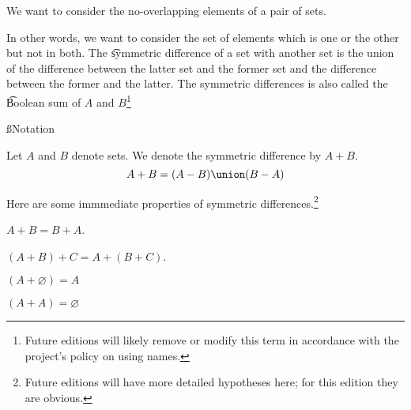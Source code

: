 

We want to consider the no-overlapping elements of a pair of sets.


In other words, we want to consider the set of elements which is one or the other but not in both.
The \t{symmetric difference} of a set with another set is the union of the difference between the latter set and the former set and the difference between the former and the latter.
The symmetric differences is also called the \t{Boolean sum} of $A$ and $B$\footnote{Future editions will likely remove or modify this term in accordance with the project's policy on using names.}

\ss{Notation}

Let $A$ and $B$ denote sets.
We denote the symmetric difference by $A + B$.
\[
  A + B = (A - B) \union (B - A)
\]


Here are some immmediate properties of symmetric differences.\footnote{Future editions will have more detailed hypotheses here; for this edition they are obvious.}

\begin{proposition}[Commutative]
  $A + B = B + A$.
\end{proposition}

\begin{proposition}[Associative]
  $(A + B) + C = A + (B + C)$.
\end{proposition}

\begin{proposition}[Identity]
  $(A + \varnothing) = A$
\end{proposition}

\begin{proposition}[Inverse]
  $(A + A) = \varnothing$
\end{proposition}

\blankpage
